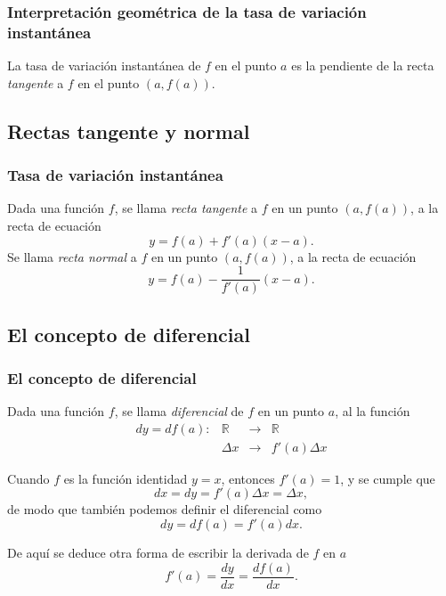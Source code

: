 \begin{frame}
\frametitle{Interpretación geométrica de la tasa de variación instantánea}
La tasa de variación instantánea de $f$ en el punto $a$ es la pendiente de la recta \emph{tangente} a $f$ en el punto $(a,f(a))$.
\begin{center}
\scalebox{1}{}
\end{center}
\end{frame}



\subsection{Rectas tangente y normal}
\begin{frame}
\frametitle{Tasa de variación instantánea}
\begin{definicion}
Dada una función $f$, se llama \emph{recta tangente} a $f$ en un punto $(a,f(a))$, a la recta de ecuación 
\[
y=f(a)+f'(a)(x-a).
\]
Se llama \emph{recta normal} a $f$ en un punto $(a,f(a))$, a la recta de ecuación 
\[
y=f(a)-\frac{1}{f'(a)}(x-a).
\]
\end{definicion}

\begin{center}
\scalebox{1}{}
\end{center}
\end{frame}



\subsection{El concepto de diferencial}
\begin{frame}
\frametitle{El concepto de diferencial}
\begin{definicion}
Dada una función $f$, se llama \emph{diferencial} de $f$ en un punto $a$, al la función
\[
\begin{array}{rccc}
dy=df(a): & \mathbb{R} & \longrightarrow & \mathbb{R} \\
& \Delta x & \longrightarrow & f'(a)\Delta x
\end{array}
\]
\end{definicion}

Cuando $f$ es la función identidad $y=x$,  entonces $f'(a)=1$, y se cumple que
\[ dx=dy=f'(a)\Delta x=\Delta x,\]
de modo que también podemos definir el diferencial como 
\[dy=df(a)=f'(a)dx.\]

De aquí se deduce otra forma de escribir la derivada de $f$ en $a$
\[f'(a)=\frac{dy}{dx}=\frac{df(a)}{dx}.\]
\end{frame}


